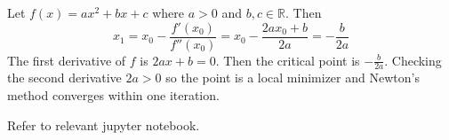 \documentclass[12pt]{article}
\newcommand{\R}{\mathbb{R}}
\newenvironment{problem}[2][Problem]{\begin{trivlist}
\item[\hskip \labelsep {\bfseries #1}\hskip \labelsep {\bfseries #2}]}{\end{trivlist}}
\begin{document}
\begin{problem}{11.} 
Let $f(x) = ax^2 + bx + c$ where $a > 0$ and $b,c \in \R$. Then
$$x_1 = x_0 - \frac{f'(x_0)}{f''(x_0)} = x_0 - \frac{2ax_0 + b}{2a} = - \frac{b}{2a}$$
The first derivative of $f$ is $2ax +b  = 0$. Then the critical point is $- \frac{b}{2a}$. Checking the second derivative $2a > 0$ so the point is a local minimizer and Newton's method converges within one iteration. 
\end{problem}

\begin{problem}{14.} 
Refer to relevant jupyter notebook. 
\end{problem}
\end{document}
